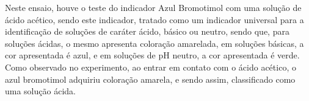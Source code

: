 \begin{figure}[h]
            \qquad
            \label{fig:experimento16}
        \end{figure}
    
    	\indent Neste ensaio, houve o teste do indicador Azul Bromotimol com uma solução de ácido acético, sendo este indicador, tratado como um indicador universal para a identificação de soluções de caráter ácido, básico ou neutro, sendo que, para soluções ácidas, o mesmo apresenta coloração amarelada, em soluções básicas, a cor apresentada é azul, e em soluções de pH neutro, a cor apresentada é verde.\\
    	
    	\indent Como observado no experimento, ao entrar em contato com o ácido acético, o azul bromotimol adquiriu coloração amarela, e sendo assim, classificado como uma solução ácida.

